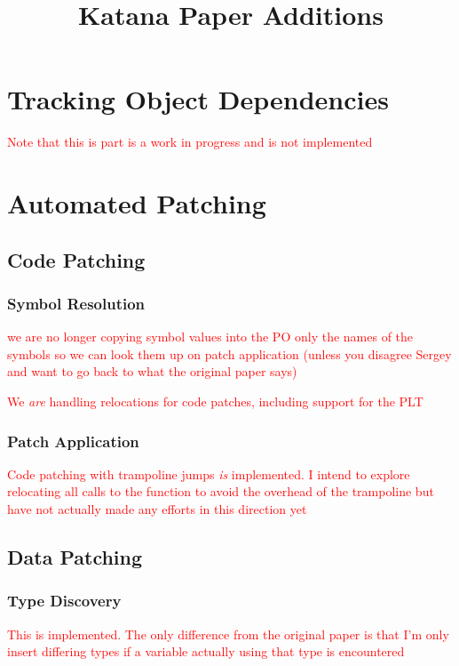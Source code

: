 \documentclass[a4paper,12pt]{article}
\begin{document}
\title{Katana Paper Additions}
\maketitle

\addtocounter{section}{1}

\section{Tracking Object Dependencies}
\textcolor{red}{Note that this is part is a work in progress and is
  not implemented}

\section{Automated Patching}
\subsection{Code Patching}
\subsubsection{Symbol Resolution}
\textcolor{red}{we are no longer copying symbol values into the PO
  only the names of the symbols so we can look them up on patch
  application (unless you disagree Sergey and want to go back to what
  the original paper says)}

\textcolor{red}{We \emph{are} handling relocations for code patches,
  including support for the PLT}

\subsubsection{Patch Application}
\textcolor{red}{Code patching with trampoline jumps \emph{is}
  implemented. I intend to explore relocating all calls to the
  function to avoid the overhead of the trampoline but have not
  actually made any efforts in this direction yet}

\subsection{Data Patching}
\subsubsection{Type Discovery}
\textcolor{red}{This is implemented. The only difference from the
  original paper is that I'm only insert differing types if a variable
actually using that type is encountered}
\end{document}
